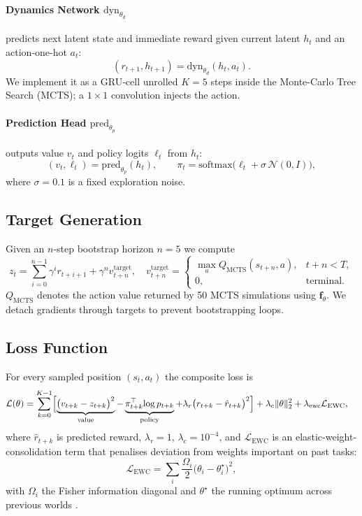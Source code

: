\paragraph{Dynamics Network $\mathrm{dyn}_{\theta_d}$}
predicts next latent state and immediate reward given current latent
$h_t$ and an action‐one-hot $a_t$:
\[
(r_{t+1},h_{t+1})=\mathrm{dyn}_{\theta_d}(h_t,a_t).
\]
We implement it as a GRU‐cell unrolled $K=5$ steps inside the Monte-Carlo Tree
Search (MCTS); a $1\times1$ convolution injects the action.

\paragraph{Prediction Head $\mathrm{pred}_{\theta_p}$}
outputs value $v_t$ and policy logits $\ell_t$ from $h_t$:
\[
(v_t,\ell_t)=\mathrm{pred}_{\theta_p}(h_t),\qquad
\pi_t=\mathrm{softmax}\bigl(\ell_t+\sigma\,\mathcal N(0,I)\bigr),
\]
where $\sigma=0.1$ is a fixed exploration noise.

\subsection{Target Generation}

Given an $n$-step bootstrap horizon $n=5$ we compute
\[
z_t=\sum_{i=0}^{n-1}\gamma^ir_{t+i+1}
      +\gamma^n v_{t+n}^{\text{target}},\quad
v_{t+n}^{\text{target}}
  =\begin{cases}
     \max_a Q_{\text{MCTS}}(s_{t+n},a), & t+n<T,\\[4pt]
     0, & \text{terminal.}
   \end{cases}
\]
$Q_{\text{MCTS}}$ denotes the action value returned by 50 MCTS
simulations using $\mathbf f_\theta$.  We detach gradients through targets to
prevent bootstrapping loops.

\subsection{Loss Function}

For every sampled position $(s_t,a_t)$ the composite loss is
\begin{align}
\mathcal L(\theta)
&=\sum_{k=0}^{K-1}
   \Bigl[
       \underbrace{\bigl(v_{t+k}-z_{t+k}\bigr)^2}_{\text{value}}
      -\underbrace{\pi_{t+k}^{\top}\!\log p_{t+k}}_{\text{policy}}
      +\lambda_r \bigl(r_{t+k}-\hat r_{t+k}\bigr)^2
   \Bigr]
   +\lambda_c\|\theta\|_2^2
   +\lambda_{\mathrm{ewc}}\mathcal L_{\mathrm{EWC}},
\label{eq:full-loss}
\end{align}
where $\hat r_{t+k}$ is predicted reward,
$\lambda_r=1$, $\lambda_c=10^{-4}$, and
$\mathcal L_{\mathrm{EWC}}$ is an elastic-weight-consolidation term that
penalises deviation from weights important on past tasks:
\[
\mathcal L_{\mathrm{EWC}}
  =\sum_{i}\frac{\Omega_i}{2}\bigl(\theta_i-\theta_i^{\star}\bigr)^2,
\]
with $\Omega_i$ the Fisher information diagonal and
$\theta^{\star}$ the running optimum across previous worlds
\parencite{kirkpatrick2017ewc}.

